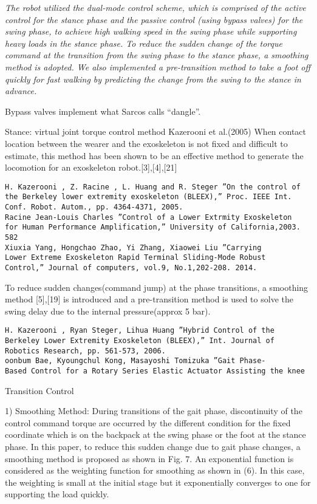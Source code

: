 \documentclass[letterpaper,12pt,fullpage]{article}
\begin{document}
{\it The robot utilized the dual-mode control scheme, which is
comprised of the active control for the stance phase and the
passive control (using bypass valves) for the swing phase, to achieve high walking
speed in the swing phase while supporting heavy loads in
the stance phase. To reduce the sudden change of the torque
command at the transition from the swing phase to the stance
phase, a smoothing method is adopted. We also implemented
a pre-transition method to take a foot off quickly for fast
walking by predicting the change from the swing to the stance
in advance.}~\cite{IEEE07222598}

Bypass valves implement what Sarcos calls ``dangle''.

Stance: virtual joint torque control method Kazerooni et al.(2005)
When contact location between the wearer and the
exoskeleton is not fixed and difficult to estimate, this method
has been shown to be an effective method to generate the
locomotion for an exoskeleton robot.[3],[4],[21]
\begin{verbatim}
H. Kazerooni , Z. Racine , L. Huang and R. Steger ”On the control of
the Berkeley lower extremity exoskeleton (BLEEX),” Proc. IEEE Int.
Conf. Robot. Autom., pp. 4364-4371, 2005.
Racine Jean-Louis Charles ”Control of a Lower Extrmity Exoskeleton
for Human Performance Amplification,” University of California,2003.
582
Xiuxia Yang, Hongchao Zhao, Yi Zhang, Xiaowei Liu ”Carrying
Lower Extreme Exoskeleton Rapid Terminal Sliding-Mode Robust
Control,” Journal of computers, vol.9, No.1,202-208. 2014.
\end{verbatim}

To reduce
sudden changes(command jump) at the phase transitions, a
smoothing method [5],[19] is introduced and a pre-transition
method is used to solve the swing delay due to the internal
pressure(approx 5 bar).
\begin{verbatim}
H. Kazerooni , Ryan Steger, Lihua Huang ”Hybrid Control of the
Berkeley Lower Extremity Exoskeleton (BLEEX),” Int. Journal of
Robotics Research, pp. 561-573, 2006.
oonbum Bae, Kyoungchul Kong, Masayoshi Tomizuka ”Gait Phase-
Based Control for a Rotary Series Elastic Actuator Assisting the knee
\end{verbatim}

Transition Control

1) Smoothing Method: During transitions of the gait
phase, discontinuity of the control command torque are
occurred by the different condition for the fixed coordinate
which is on the backpack at the swing phase or the foot at
the stance phase. In this paper, to reduce this sudden change
due to gait phase changes, a smoothing method is proposed
as shown in Fig. 7. An exponential function is considered
as the weighting function for smoothing as shown in (6).
In this case, the weighting is small at the initial stage but
it exponentially converges to one for supporting the load
quickly.
\end{document}

